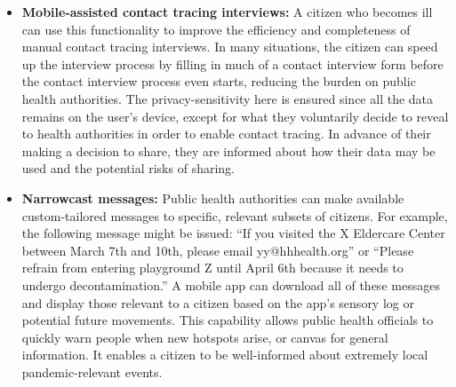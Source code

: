 \documentclass{article}
\begin{document}
\begin{itemize}
\item \textbf{Mobile-assisted contact tracing interviews:}  A citizen who becomes ill can use this functionality to improve the efficiency and completeness of manual contact tracing interviews.  In many situations, the citizen can speed up the interview process by filling in much of a contact interview form before the contact interview process even starts, reducing the burden on public health authorities.  The privacy-sensitivity here is ensured since all the data remains on the user's device, except for what they voluntarily decide to reveal to health authorities in order to enable contact tracing. In advance of their making a decision to share, they are informed about how their data may be used and the potential risks of sharing. 

\item \textbf{Narrowcast messages:}  Public health authorities can make available custom-tailored messages to specific, relevant subsets of citizens.  For example, the following message might be issued: ``If you visited the X Eldercare Center between March 7th and 10th, please email yy@hhhealth.org'' or ``Please refrain from entering playground Z until April 6th because it needs to undergo decontamination.''  A mobile app can download all of these messages and display those relevant to a citizen based on the app's sensory log or potential future movements.  This capability allows public health officials to quickly warn people when new hotspots arise, or canvas for general information.  It enables a citizen to be well-informed about extremely local pandemic-relevant events.  


\end{itemize}
\end{document}
